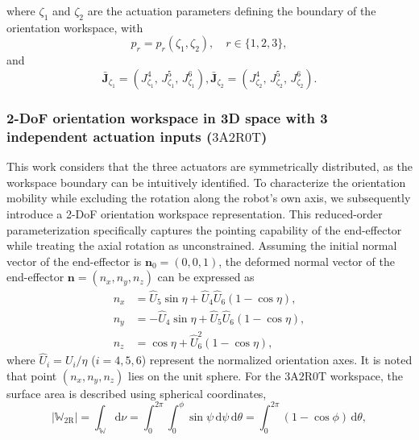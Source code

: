 \documentclass[journal]{IEEEtran}
\theoremstyle{definition}
\begin{document}
where $\zeta_1$ and $\zeta_2$ are the actuation parameters defining the boundary of the orientation workspace, with
\begin{equation}
  p_r = p_r(\zeta_1,\zeta_2), \quad r \in \{1, 2, 3\},
\end{equation}
and
\begin{equation}
    \bar{\mathbf{J}}_{\zeta_1} = \left(J^{4}_{\zeta_1},\,J^{5}_{\zeta_1},\,J^{6}_{\zeta_1}\right),
    \bar{\mathbf{J}}_{\zeta_2} = \left(J^{4}_{\zeta_2},\,J^{5}_{\zeta_2},\,J^{6}_{\zeta_2}\right).
\end{equation}

\subsubsection{2-DoF orientation workspace in 3D space with 3 independent actuation inputs ($3\text{A}2\text{R}0\text{T}$)} This work considers that the three actuators are symmetrically distributed, as the workspace boundary can be intuitively identified. To characterize the orientation mobility while excluding the rotation along the robot's own axis, we subsequently introduce a 2-DoF orientation workspace representation. This reduced-order parameterization specifically captures the pointing capability of the end-effector while treating the axial rotation as unconstrained. Assuming the initial normal vector of the end-effector is \(\mathbf{n}_0=(0, 0, 1)\), the deformed normal vector of the end-effector \(\mathbf{n} = (n_x, n_y, n_z)\) can be expressed as
\begin{equation}
  \begin{split}
    n_x &= \hat{U}_5 \sin\eta + \hat{U}_4 \hat{U}_6 (1 - \cos\eta),\\
    n_y &= -\hat{U}_4 \sin\eta + \hat{U}_5 \hat{U}_6 (1 - \cos\eta),\\
    n_z &= \cos\eta + \hat{U}_6^2 (1 - \cos\eta),
  \end{split}
  \label{eq:normal_vector_deformed}
\end{equation}
where \(\hat{U}_i = U_i / \eta\)  (\(i = 4, 5, 6\)) represent the normalized orientation axes. It is noted that point \((n_x, n_y, n_z)\) lies on the unit sphere. For the $3\text{A}2\text{R}0\text{T}$ workspace, the surface area is described using spherical coordinates,
\begin{equation}
  \left|\mathbb{W}_\text{2R}\right| = \int_\mathbb{W} \mathrm{d} \nu  = \int_0^{2\pi}\int_0^{\phi} \sin\psi \,\mathrm{d}\psi  \, \mathrm{d}\theta = \int_0^{2\pi} \left(1 - \cos\phi\right) \, \mathrm{d}\theta,
  \label{eq:orientation_workspace_2d}
\end{equation}
\end{document}
